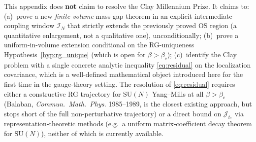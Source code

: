 \begin{remark}
\label{rem:csl_honest_status}
This appendix does \textbf{not} claim to resolve the Clay Millennium
Prize. It claims to:
(a)~prove a new \emph{finite-volume} mass-gap theorem in an explicit
intermediate-coupling window $\mathcal{I}_{N}$ that strictly extends
the previously proved OS region (a quantitative enlargement, not a
qualitative one), unconditionally;
(b)~prove a uniform-in-volume extension conditional on the
RG-uniqueness Hypothesis~\ref{hyp:rg_unique} (which is open for
$\beta>\beta_{c}$);
(c)~identify the Clay problem with a single concrete analytic
inequality \eqref{eq:residual} on the localization covariance, which
is a well-defined mathematical object introduced here for the first
time in the gauge-theory setting.
The resolution of \eqref{eq:residual} requires either a constructive
RG trajectory for $\mathrm{SU}(N)$ Yang--Mills at all $\beta>\beta_{c}$
(Balaban, \emph{Commun.\ Math.\ Phys.} 1985--1989, is the closest
existing approach, but stops short of the full non-perturbative
trajectory) or a direct bound on $\mathcal{J}_{t_{*}}$ via
representation-theoretic methods (e.g.\ a uniform matrix-coefficient
decay theorem for $\mathrm{SU}(N)$), neither of which is currently
available.
\end{remark}

\endinput

